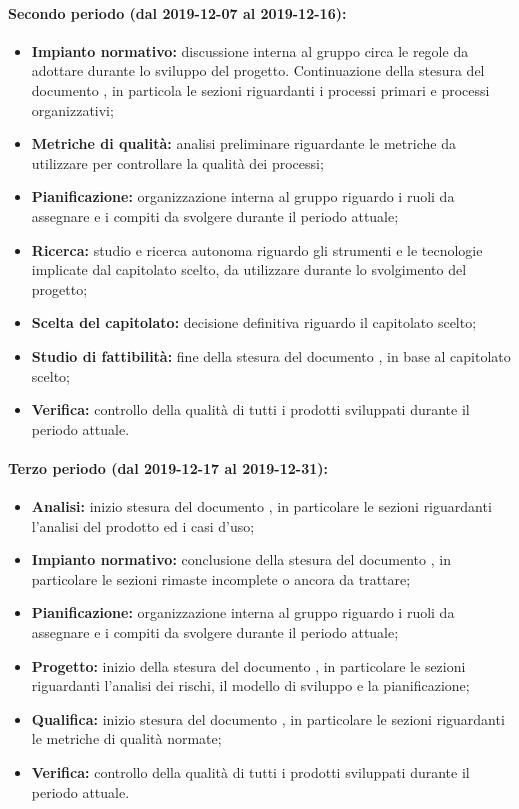 			\paragraph{Secondo periodo (dal 2019-12-07 al 2019-12-16):}
				\begin{itemize}
					\item \textbf{Impianto normativo:} discussione interna al gruppo circa le regole da adottare durante lo sviluppo del progetto. Continuazione della stesura del documento , in particola le sezioni riguardanti i processi primari e processi organizzativi;
					\item \textbf{Metriche di qualità:} analisi preliminare riguardante le metriche da utilizzare per controllare la qualità dei processi;
					\item \textbf{Pianificazione:} organizzazione interna al gruppo riguardo i ruoli da assegnare e i compiti da svolgere durante il periodo attuale;
					\item \textbf{Ricerca:} studio e ricerca autonoma riguardo gli strumenti e le tecnologie implicate dal capitolato scelto, da utilizzare durante lo svolgimento del progetto;
					\item \textbf{Scelta del capitolato:} decisione definitiva riguardo il capitolato scelto;
					\item \textbf{Studio di fattibilità:} fine della stesura del documento , in base al capitolato scelto;
					\item \textbf{Verifica:} controllo della qualità di tutti i prodotti sviluppati durante il periodo attuale.
				\end{itemize}
			\paragraph{Terzo periodo (dal 2019-12-17 al 2019-12-31):}
				\begin{itemize}
					\item \textbf{Analisi:} inizio stesura del documento , in particolare le sezioni riguardanti l'analisi del prodotto ed i casi d'uso;
					\item \textbf{Impianto normativo:} conclusione della stesura del documento , in particolare le sezioni rimaste incomplete o ancora da trattare;
					\item \textbf{Pianificazione:} organizzazione interna al gruppo riguardo i ruoli da assegnare e i compiti da svolgere durante il periodo attuale;
					\item \textbf{Progetto:} inizio della stesura del documento , in particolare le sezioni riguardanti l'analisi dei rischi, il modello di sviluppo e la pianificazione;
					\item \textbf{Qualifica:} inizio stesura del documento , in particolare le sezioni riguardanti le metriche di qualità normate;
					\item \textbf{Verifica:} controllo della qualità di tutti i prodotti sviluppati durante il periodo attuale.
				\end{itemize}
